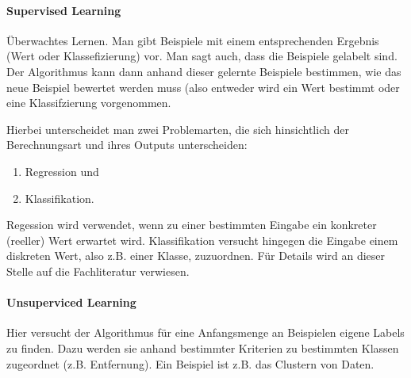 \paragraph{Supervised Learning}
Überwachtes Lernen. Man gibt Beispiele mit einem entsprechenden Ergebnis (Wert oder Klassefizierung) vor. Man sagt auch, dass die Beispiele gelabelt sind. Der Algorithmus kann dann anhand dieser gelernte Beispiele bestimmen, wie das neue Beispiel bewertet werden muss (also entweder wird ein Wert bestimmt oder eine Klassifzierung vorgenommen.

Hierbei unterscheidet man zwei Problemarten, die sich hinsichtlich der Berechnungsart und ihres Outputs unterscheiden:
\begin{enumerate}
\item Regression und
\item Klassifikation.
\end{enumerate}
Regession wird verwendet, wenn zu einer bestimmten Eingabe ein konkreter (reeller) Wert erwartet wird. Klassifikation versucht hingegen die Eingabe einem diskreten Wert, also z.B. einer Klasse, zuzuordnen. Für Details wird an dieser Stelle auf die Fachliteratur verwiesen.

\paragraph{Unsuperviced Learning}
Hier versucht der Algorithmus für eine Anfangsmenge an Beispielen eigene Labels zu finden. Dazu werden sie anhand bestimmter Kriterien zu bestimmten Klassen zugeordnet (z.B. Entfernung). Ein Beispiel ist z.B. das Clustern von Daten.

\begin{comment}
	(Hier werden die prinzipiellen Arbeitsweisen des Core-Algorithmus TLD dargestellt und erläutert. Einleitend werden sie anhand von Diagrammen/Bildern/Beispielen erläutert, unter den folgenden Teilüberschriften wird vertiefend erklärt.

	Die Initialisierung des Algorithmus erfolgt über die Definition der BoundingBox. Dies kann auf unterschiedliche Weise, wie z.B. das Markieren eines Objekts in einem Kamera- oder Videobild, oder durch vorgeschaltete Programmteile, die auf das Erkennen eines bestimmten Objekts trainiert wurden, geschehen. Ausgehende von diesem ersten Bild werden die einzelnen Komponenten initialisiert. )
\end{comment}


